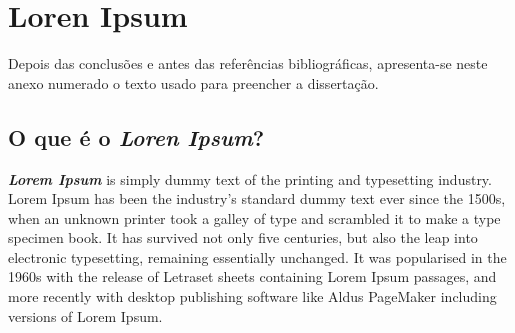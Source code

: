 \chapter{Loren Ipsum} \label{ap1:loren}

Depois das conclusões e antes das referências bibliográficas,
apresenta-se neste anexo numerado o texto usado para preencher a
dissertação.

\section{O que é o \emph{Loren Ipsum}?}

\emph{\textbf{Lorem Ipsum}} is simply dummy text of the printing and
typesetting industry. Lorem Ipsum has been the industry's standard
dummy text ever since the 1500s, when an unknown printer took a galley
of type and scrambled it to make a type specimen book. It has survived
not only five centuries, but also the leap into electronic
typesetting, remaining essentially unchanged. It was popularised in
the 1960s with the release of Letraset sheets containing Lorem Ipsum
passages, and more recently with desktop publishing software like
Aldus PageMaker including versions of Lorem Ipsum. 
